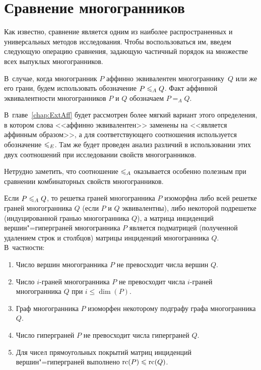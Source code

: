 \section{Сравнение многогранников}
\label{sec:AffCompare}

Как известно, сравнение является одним из наиболее распространенных и универсальных методов исследования.
Чтобы воспользоваться им, введем следующую операцию сравнения,
задающую частичный порядок на множестве всех выпуклых многогранников.

\begin{definition}\label{def:ineA}
В~случае, когда многогранник $P$ аффинно эквивалентен многограннику~$Q$ или же его грани, будем использовать обозначение $P \leqslant_A Q$.
Факт аффинной эквивалентности многогранников $P$ и $Q$ обозначаем $P =_A Q$.
\end{definition}

В~главе~\ref{chap:ExtAff} будет рассмотрен более мягкий вариант этого определения,
в котором слова <<аффинно эквивалентен>> заменены на <<является аффинным образом>>, а для соответствующего соотношения используется обозначение $\leqslant_E$. Там же будет проведен анализ различий в использовании этих двух соотношений при исследовании свойств многогранников.

Нетрудно заметить, что соотношение $\leqslant_A$ оказывается особенно полезным при сравнении комбинаторных свойств 
многогранников.

\begin{property}
Если $P \leqslant_A Q$, то решетка граней многогранника $P$ 
изоморфна либо всей решетке граней многогранника $Q$ (если $P$ и $Q$ эквивалентны), либо некоторой подрешетке (индуцированной гранью многогранника $Q$), а матрица инциденций вершин"=гиперграней многогранника $P$ является подматрицей (полученной удалением строк и столбцов) матрицы инциденций многогранника $Q$. В~частности:
\begin{enumerate}
	\item Число вершин многогранника $P$ не превосходит числа вершин $Q$.
	\item Число $i$-граней многогранника $P$ не превосходит числа $i$-граней многогранника $Q$ при $i \le \dim(P)$.
	\item Граф многогранника $P$ изоморфен некоторому подграфу графа многогранника $Q$.
	\item Число гиперграней $P$ не превосходит числа гиперграней $Q$.
	\item Для чисел прямоугольных покрытий матриц инциденций вершин"=гиперграней выполнено $\operatorname{rc}(P) \leqslant \operatorname{rc}(Q)$.
\end{enumerate}
\end{property}


